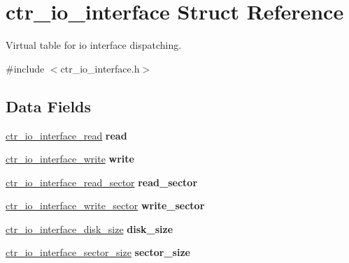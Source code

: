 \hypertarget{structctr__io__interface}{}\section{ctr\+\_\+io\+\_\+interface Struct Reference}
\label{structctr__io__interface}


Virtual table for io interface dispatching.  




{\ttfamily \#include $<$ctr\+\_\+io\+\_\+interface.\+h$>$}

\subsection*{Data Fields}
\begin{DoxyCompactItemize}
\item 
\hyperlink{ctr__io__interface_8h_ab9cde9bf42fb0444d7157b94409c3438}{ctr\+\_\+io\+\_\+interface\+\_\+read} {\bfseries read}\hypertarget{structctr__io__interface_a3b9e60f75dd84a72cfb7f611c7e84645}{}\label{structctr__io__interface_a3b9e60f75dd84a72cfb7f611c7e84645}

\item 
\hyperlink{ctr__io__interface_8h_a646e96cfb64d0ca0738573cb7c4b8cb6}{ctr\+\_\+io\+\_\+interface\+\_\+write} {\bfseries write}\hypertarget{structctr__io__interface_ab6c8be6fdff3ed211be2725a83d7660a}{}\label{structctr__io__interface_ab6c8be6fdff3ed211be2725a83d7660a}

\item 
\hyperlink{ctr__io__interface_8h_a34efbc360de76e7e3b6f783081f37c71}{ctr\+\_\+io\+\_\+interface\+\_\+read\+\_\+sector} {\bfseries read\+\_\+sector}\hypertarget{structctr__io__interface_a74aead9f96c4cd7bd6d30b2b3b8d30a5}{}\label{structctr__io__interface_a74aead9f96c4cd7bd6d30b2b3b8d30a5}

\item 
\hyperlink{ctr__io__interface_8h_ae0f2367bf7f0d70ea4132a071ddd3f11}{ctr\+\_\+io\+\_\+interface\+\_\+write\+\_\+sector} {\bfseries write\+\_\+sector}\hypertarget{structctr__io__interface_ace5c4a532ca4b7e293a6d2f6aa3fe0bd}{}\label{structctr__io__interface_ace5c4a532ca4b7e293a6d2f6aa3fe0bd}

\item 
\hyperlink{ctr__io__interface_8h_adc0d60b225aaa94896eafbb118278bbf}{ctr\+\_\+io\+\_\+interface\+\_\+disk\+\_\+size} {\bfseries disk\+\_\+size}\hypertarget{structctr__io__interface_ad202809579ac8a92caa11edb99ff5014}{}\label{structctr__io__interface_ad202809579ac8a92caa11edb99ff5014}

\item 
\hyperlink{ctr__io__interface_8h_a711603142cb4fd575422e8abfbaed9ad}{ctr\+\_\+io\+\_\+interface\+\_\+sector\+\_\+size} {\bfseries sector\+\_\+size}\hypertarget{structctr__io__interface_a535479eb1bc5f198e569c571a17674f3}{}\label{structctr__io__interface_a535479eb1bc5f198e569c571a17674f3}

\end{DoxyCompactItemize}


